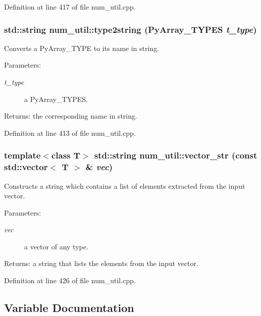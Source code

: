 Definition at line 417 of file num\_\-util.cpp.
\subsubsection{\setlength{\rightskip}{0pt plus 5cm}std::string num\_\-util::type2string (Py\-Array\_\-TYPES {\em t\_\-type})}\label{namespacenum__util_a55}


Converts a Py\-Array\_\-TYPE to its name in string. \begin{Desc}
\item[Parameters:]
\begin{description}
\item[{\em t\_\-type}]a Py\-Array\_\-TYPES. \end{description}
\end{Desc}
\begin{Desc}
\item[Returns:]the corresponding name in string.\end{Desc}


Definition at line 413 of file num\_\-util.cpp.
\subsubsection{\setlength{\rightskip}{0pt plus 5cm}template$<$class T$>$ std::string num\_\-util::vector\_\-str (const std::vector$<$ T $>$ \& {\em vec})\hspace{0.3cm}{\tt  [inline]}}\label{namespacenum__util_a58}


Constructs a string which contains a list of elements extracted from the input vector. \begin{Desc}
\item[Parameters:]
\begin{description}
\item[{\em vec}]a vector of any type. \end{description}
\end{Desc}
\begin{Desc}
\item[Returns:]a string that lists the elements from the input vector.\end{Desc}


Definition at line 426 of file num\_\-util.cpp.

\subsection{Variable Documentation}
